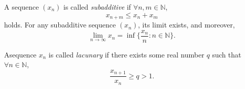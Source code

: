 \documentclass[12pt]{article}
\begin{document}
\begin{lemma}
   A sequence $(x_n)$ is called \emph{subadditive} if $\forall n, m \in \mathbb{N}$, \[
   x_{n+m} \leq x_n + x_m 
   \]
   holds. For any subadditive sequence $(x_n)$, its limit exists, and moreover, \[
    \lim_{n\to\infty} x_n = \inf \{\frac{x_n}{n} : n \in \mathbb{N}\}.
   \]
\end{lemma}

\begin{definition}
  Asequence $x_n$ is called \emph{lacunary} if there exists some real number $q$ such that $\forall n \in \mathbb{N}$, \[
    \frac{x_{n+1}}{x_n} \geq q > 1.
  \]
\end{definition}




\end{document}

